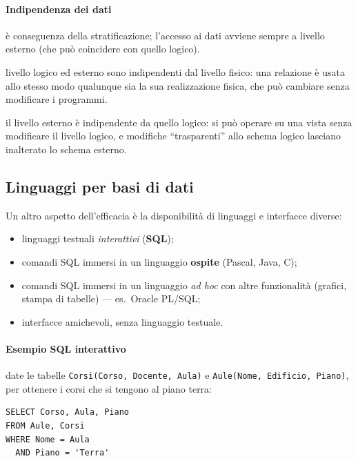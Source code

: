 \documentclass[a4paper,12pt]{article}
\begin{document}
\paragraph{Indipendenza dei dati} è conseguenza della stratificazione;
l'accesso ai dati avviene sempre a livello esterno (che può coincidere con
quello logico).
\begin{description}[style=nextline]
  \item[Indipendenza fisica] livello logico ed esterno sono indipendenti dal
    livello fisico: una relazione è usata allo stesso modo qualunque sia la sua
    realizzazione fisica, che può cambiare senza modificare i programmi.
  \item[Indipendenza logica] il livello esterno è indipendente da quello logico:
    si può operare su una vista senza modificare il livello logico, e modifiche
    ``trasparenti'' allo schema logico lasciano inalterato lo schema esterno.
\end{description}

\subsection{Linguaggi per basi di dati}

Un altro aspetto dell'efficacia è la disponibilità di linguaggi e interfacce
diverse:
\begin{itemize}
  \item linguaggi testuali \emph{interattivi} (\textbf{SQL});
  \item comandi SQL immersi in un linguaggio \textbf{ospite} (Pascal, Java, C);
  \item comandi SQL immersi in un linguaggio \emph{ad hoc} con altre
    funzionalità (grafici, stampa di tabelle) --- es.\ Oracle PL/SQL;
  \item interfacce amichevoli, senza linguaggio testuale.
\end{itemize}

\paragraph{Esempio SQL interattivo} date le tabelle \texttt{Corsi(Corso,
Docente, Aula)} e \texttt{Aule(Nome, Edificio, Piano)}, per ottenere i corsi che
si tengono al piano terra:
\begin{verbatim}
SELECT Corso, Aula, Piano
FROM Aule, Corsi
WHERE Nome = Aula
  AND Piano = 'Terra'
\end{verbatim}
\end{document}
